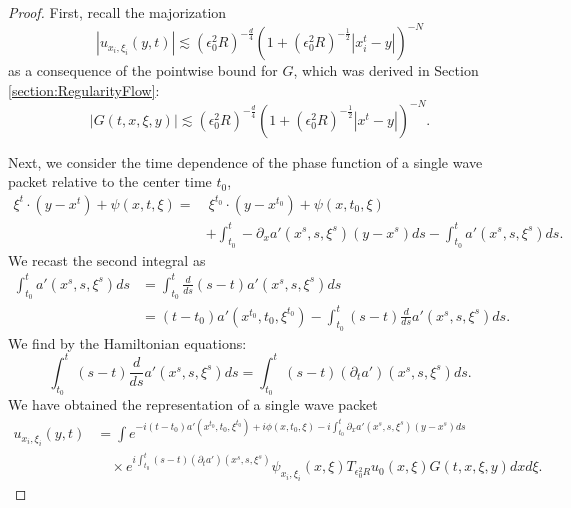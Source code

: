 \documentclass{amsart}
\theoremstyle{definition}
\begin{document}
\begin{proof}
First, recall the majorization
\begin{equation*}
    |u_{x_i,\xi_i}(y,t)| \lesssim (\epsilon_0^2 R)^{-\frac{d}{4}} (1+ (\epsilon_0^2 R)^{-\frac{1}{2}} |x_i^t - y|)^{-N}
\end{equation*}
as a consequence of the pointwise bound for $G$, which was derived in Section \ref{section:RegularityFlow}:
\begin{equation}
\label{eq:MajoriizationG}
    |G(t,x,\xi,y)| \lesssim (\epsilon_0^2 R)^{-\frac{d}{4}} (1+ (\epsilon_0^2 R)^{-\frac{1}{2}} |x^t - y|)^{-N}.
\end{equation}

Next, we consider the time dependence of the phase function of a single wave packet relative to the center time $t_0$,
\begin{equation}
\label{eq:ExpPhase}
\begin{aligned}
\xi^t \cdot (y-x^t) + \psi(x,t,\xi) = & \  \xi^{t_0} \cdot (y-x^{t_0}) + \psi(x,t_0,\xi)  \\
& + \int_{t_0}^t \!\!\!\! - \partial_x a'(x^s,s,\xi^s) (y-x^s) ds - \int_{t_0}^t \!\!\! a'(x^s,s,\xi^s) ds.
\end{aligned}
\end{equation}
We recast the second integral as
\begin{equation*}
\begin{split}
\int_{t_0}^t a'(x^s,s,\xi^s) ds &= \int_{t_0}^t \frac{d}{ds} (s-t) a'(x^s,s,\xi^s) ds \\
&= (t-t_0) a'(x^{t_0},t_0,\xi^{t_0}) - \int_{t_0}^t (s-t) \frac{d}{ds} a'(x^s,s,\xi^s) ds.
\end{split}
\end{equation*}
We find by the Hamiltonian equations:
\begin{equation*}
\int_{t_0}^t (s-t) \frac{d}{ds} a'(x^s,s,\xi^s) ds = \int_{t_0}^t (s-t) (\partial_t a')(x^s,s,\xi^s) ds.
\end{equation*}
We have obtained the representation of a single wave packet
\begin{equation*}
\begin{split}
    u_{x_i,\xi_i}(y,t) &= \int e^{-i (t-t_0) a'(x^{t_0},t_0,\xi^{t_0}) + i \phi(x,t_0,\xi) -i \int_{t_0}^t \partial_x a'(x^s,s,\xi^s)(y-x^s) ds} \\
    &\quad \times e^{i \int_{t_0}^t (s-t) (\partial_t a')(x^s,s,\xi^s)} \psi_{x_i,\xi_i}(x,\xi) T_{\epsilon_0^2 R} u_0(x,\xi) G(t,x,\xi,y) dx d\xi.
    \end{split}

\end{equation*}
\end{proof}
\end{document}
